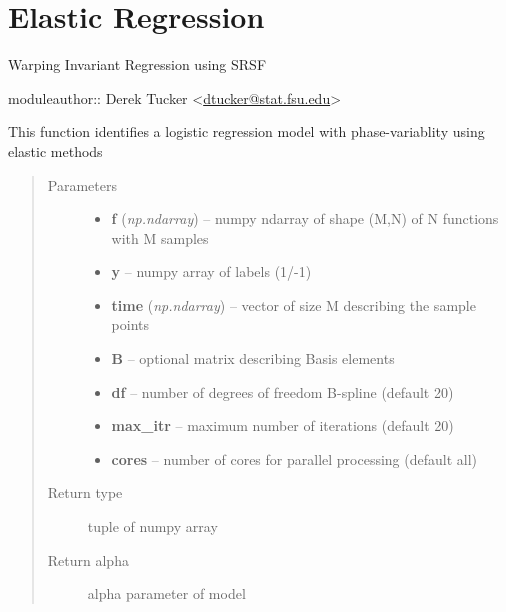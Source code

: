 \documentclass[letterpaper,10pt,english]{sphinxmanual}
\begin{document}
\chapter{Elastic Regression}
\label{regression:elastic-regression}\label{regression:module-regression}\label{regression::doc}
Warping Invariant Regression using SRSF

moduleauthor:: Derek Tucker \textless{}\href{mailto:dtucker@stat.fsu.edu}{dtucker@stat.fsu.edu}\textgreater{}

\begin{fulllineitems}
\label{regression:regression.elastic_logistic}
This function identifies a logistic regression model with
phase-variablity using elastic methods
\begin{quote}\begin{description}
\item[{Parameters}] \leavevmode\begin{itemize}
\item {} 
\textbf{f} (\emph{np.ndarray}) -- numpy ndarray of shape (M,N) of N functions with M samples

\item {} 
\textbf{y} -- numpy array of labels (1/-1)

\item {} 
\textbf{time} (\emph{np.ndarray}) -- vector of size M describing the sample points

\item {} 
\textbf{B} -- optional matrix describing Basis elements

\item {} 
\textbf{df} -- number of degrees of freedom B-spline (default 20)

\item {} 
\textbf{max\_itr} -- maximum number of iterations (default 20)

\item {} 
\textbf{cores} -- number of cores for parallel processing (default all)

\end{itemize}

\item[{Return type}] \leavevmode
tuple of numpy array

\item[{Return alpha}] \leavevmode
alpha parameter of model


\end{description}
\end{quote}
\end{fulllineitems}
\end{document}
